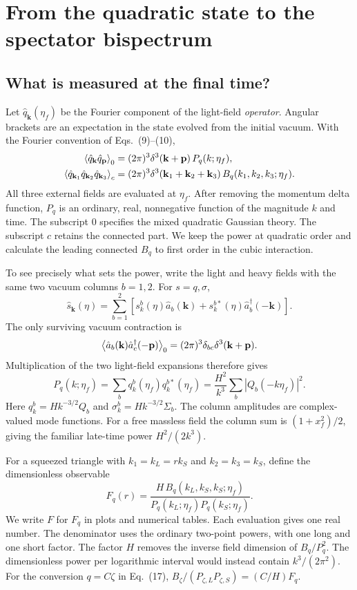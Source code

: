 \section{From the quadratic state to the spectator bispectrum}
\subsection{What is measured at the final time?}
Let $\hat q_{\mathbf k}(\eta_f)$ be the Fourier component of the light-field \emph{operator}. Angular brackets are an expectation in the state evolved from the initial vacuum. With the Fourier convention of Eqs.~(9)--(10),
\begin{align}
\left\langle \hat q_{\mathbf k}\hat q_{\mathbf p}\right\rangle_0
  &=(2\pi)^3\delta^3(\mathbf k+\mathbf p)\,P_q(k;\eta_f),\\
\left\langle \hat q_{\mathbf k_1}\hat q_{\mathbf k_2}\hat q_{\mathbf k_3}\right\rangle_c
  &=(2\pi)^3\delta^3(\mathbf k_1+\mathbf k_2+\mathbf k_3)\,B_q(k_1,k_2,k_3;\eta_f).
\end{align}
All three external fields are evaluated at $\eta_f$. After removing the momentum delta function, $P_q$ is an ordinary, real, nonnegative function of the magnitude $k$ and time. The subscript $0$ specifies the mixed quadratic Gaussian theory. The subscript $c$ retains the connected part. We keep the power at quadratic order and calculate the leading connected $B_q$ to first order in the cubic interaction.

To see precisely what sets the power, write the light and heavy fields with the same two vacuum columns $b=1,2$. For $s=q,\sigma$,
\begin{equation}
\hat s_{\mathbf k}(\eta)=\sum_{b=1}^2
 [s_k^b(\eta)\hat a_b(\mathbf k)+s_k^{b*}(\eta)\hat a_b^\dagger(-\mathbf k)] .
\end{equation}
The only surviving vacuum contraction is
\[\left\langle \hat a_b(\mathbf k)\hat a_c^\dagger(-\mathbf p)\right\rangle_0=(2\pi)^3\delta_{bc}\delta^3(\mathbf k+\mathbf p).\]
Multiplication of the two light-field expansions therefore gives
\begin{equation}
 P_q(k;\eta_f)=\sum_b q_k^b(\eta_f)q_k^{b*}(\eta_f)
 =\frac{H^2}{k^3}\sum_b|Q_b(-k\eta_f)|^2 .
\end{equation}
Here $q_k^b=H k^{-3/2}Q_b$ and $\sigma_k^b=H k^{-3/2}\Sigma_b$. The column amplitudes are complex-valued mode functions. For a free massless field the column sum is $(1+x_f^2)/2$, giving the familiar late-time power $H^2/(2k^3)$.

For a squeezed triangle with $k_1=k_L=r k_S$ and $k_2=k_3=k_S$, define the dimensionless observable
\begin{equation}\boxed{\displaystyle F_q(r)=\frac{H\,B_q(k_L,k_S,k_S;\eta_f)}
 {P_q(k_L;\eta_f)P_q(k_S;\eta_f)}.}\label{eq:shape}\end{equation}
We write $F$ for $F_q$ in plots and numerical tables. Each evaluation gives one real number. The denominator uses the ordinary two-point powers, with one long and one short factor. The factor $H$ removes the inverse field dimension of $B_q/P_q^2$. The dimensionless power per logarithmic interval would instead contain $k^3/(2\pi^2)$. For the conversion $q=C\zeta$ in Eq.~(17), $B_\zeta/(P_{\zeta,L}P_{\zeta,S})=(C/H)F_q$.

